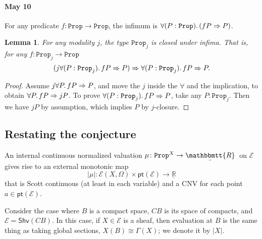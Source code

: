 \documentclass[11pt, oneside, article]{memoir}
\theoremstyle{plain}
\newtheorem{lemma}[theorem]{Lemma}
\theoremstyle{definition}
\theoremstyle{remark}
\newcommand{\const}[1]{\mathtt{#1}}
\newcommand{\cat}[1]{\mathcal{#1}}
\newcommand{\Fun}[1]{\mathsf{#1}}
\newcommand{\ul}[1]{\underline{#1}}
\newcommand{\ubar}[1]{\underaccent{\bar}{#1}}
\newcommand{\internal}[1]{\raisebox{-.03ex}{$\mathbbmtt{#1}$}}
\newcommand{\hs}{\hspace{1.1pt}}
\newcommand{\LR}{\ul{\mathbb{R}}}
\newcommand{\tRR}{\internal{R}\hs}
\newcommand{\tLR}{\ubar{\tRR}\hs}
\newcommand{\Shv}{\Fun{Shv}}
\newcommand{\Prop}{\const{Prop}}
\newcommand{\pt}{\Fun{pt}}
\newcommand{\imp}{\Rightarrow}
\begin{document}
\paragraph{May 10}

For any predicate $f:\Prop\to\Prop$, the infimum is $\forall(P:\Prop)\ldotp(fP\imp P)$.

\begin{lemma}
For any modality $j$, the type $\Prop_j$ is closed under infima. That is, for any $f:\Prop_j\to\Prop$
\[(j\forall(P:\Prop_j)\ldotp fP\imp P)\imp\forall(P:\Prop_j)\ldotp fP\imp P.\]
\end{lemma}
\begin{proof}
Assume $j\forall P\ldotp fP\imp P$, and move the $j$ inside the $\forall$ and the implication, to obtain $\forall P\ldotp fP\imp jP$. To prove $\forall(P:\Prop_j)\ldotp fP\imp P$, take any $P:\Prop_j$. Then we have $jP$ by assumption, which implies $P$ by $j$-closure.
\end{proof}

\subsection{Restating the conjecture}

An internal continuous normalized valuation $\mu\colon\Prop^X\to\tLR$ on $\cat{E}$ gives rise to an external monotonic map
\[|\mu|\colon\cat{E}(X,\Omega)\times\pt(\cat{E})\to\LR\]
that is Scott continuous (at least in each variable) and a CNV for each point $a\in\pt(\cat{E})$.

Consider the case where $B$ is a compact space, $CB$ is its space of compacts, and $\cat{E}=\Shv(CB)$. In this case, if $X\in\cat{E}$ is a sheaf, then evaluation at $B$ is the same thing as taking global sections, $X(B)\cong\Gamma(X)$; we denote it by $|X|$.
\end{document}
